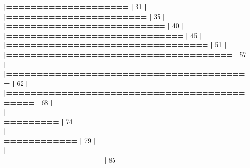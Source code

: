 \documentclass[]{book}
\newenvironment{Shaded}{\begin{snugshade}}{\end{snugshade}}
\newcommand{\DecValTok}[1]{\textcolor[rgb]{0.00,0.00,0.81}{#1}}
\newcommand{\ErrorTok}[1]{\textcolor[rgb]{0.64,0.00,0.00}{\textbf{#1}}}
\newcommand{\NormalTok}[1]{#1}
\newcommand{\OperatorTok}[1]{\textcolor[rgb]{0.81,0.36,0.00}{\textbf{#1}}}
\newcommand{\StringTok}[1]{\textcolor[rgb]{0.31,0.60,0.02}{#1}}
\begin{document}
\begin{Shaded}
\begin{Highlighting}[]
{{{{{{{\StringTok{  }\ErrorTok{|====================}\StringTok{                                             }\ErrorTok{|}\StringTok{  }\DecValTok{31}\NormalTok{%}
  \OperatorTok{|}\StringTok{                                                                       }
\StringTok{  }\ErrorTok{|=======================}\StringTok{                                          }\ErrorTok{|}\StringTok{  }\DecValTok{35}\NormalTok{%}
  \OperatorTok{|}\StringTok{                                                                       }
\StringTok{  }\ErrorTok{|==========================}\StringTok{                                       }\ErrorTok{|}\StringTok{  }\DecValTok{40}\NormalTok{%}
  \OperatorTok{|}\StringTok{                                                                       }
\StringTok{  }\ErrorTok{|=============================}\StringTok{                                    }\ErrorTok{|}\StringTok{  }\DecValTok{45}\NormalTok{%}
  \OperatorTok{|}\StringTok{                                                                       }
\StringTok{  }\ErrorTok{|=================================}\StringTok{                                }\ErrorTok{|}\StringTok{  }\DecValTok{51}\NormalTok{%}
  \OperatorTok{|}\StringTok{                                                                       }
\StringTok{  }\ErrorTok{|=====================================}\StringTok{                            }\ErrorTok{|}\StringTok{  }\DecValTok{57}\NormalTok{%}
  \OperatorTok{|}\StringTok{                                                                       }
\StringTok{  }\ErrorTok{|========================================}\StringTok{                         }\ErrorTok{|}\StringTok{  }\DecValTok{62}\NormalTok{%}
  \OperatorTok{|}\StringTok{                                                                       }
\StringTok{  }\ErrorTok{|============================================}\StringTok{                     }\ErrorTok{|}\StringTok{  }\DecValTok{68}\NormalTok{%}
  \OperatorTok{|}\StringTok{                                                                       }
\StringTok{  }\ErrorTok{|================================================}\StringTok{                 }\ErrorTok{|}\StringTok{  }\DecValTok{74}\NormalTok{%}
  \OperatorTok{|}\StringTok{                                                                       }
\StringTok{  }\ErrorTok{|===================================================}\StringTok{              }\ErrorTok{|}\StringTok{  }\DecValTok{79}\NormalTok{%}
  \OperatorTok{|}\StringTok{                                                                       }
\StringTok{  }\ErrorTok{|=======================================================}\StringTok{          }\ErrorTok{|}\StringTok{  }\DecValTok{85}\NormalTok{%}
}}}}}}}}}}}}}}}}}}
\end{Highlighting}
\end{Shaded}
\end{document}
